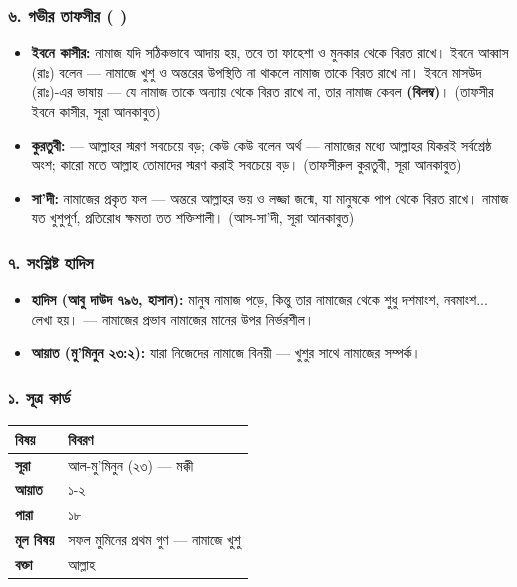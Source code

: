 \subsubsection*{৬. গভীর তাফসীর ( )}

\begin{itemize}
\item \textbf{ইবনে কাসীর:} নামাজ যদি সঠিকভাবে আদায় হয়, তবে তা ফাহেশা ও মুনকার থেকে বিরত রাখে। ইবনে আব্বাস (রাঃ) বলেন — নামাজে খুশু ও অন্তরের উপস্থিতি না থাকলে নামাজ তাকে বিরত রাখে না। ইবনে মাসউদ (রাঃ)-এর ভাষায় — যে নামাজ তাকে অন্যায় থেকে বিরত রাখে না, তার নামাজ কেবল \textbf{ (বিলম্ব)}। (তাফসীর ইবনে কাসীর, সূরা আনকাবুত)
\item \textbf{কুরতুবী:}    — আল্লাহর স্মরণ সবচেয়ে বড়; কেউ কেউ বলেন অর্থ — নামাজের মধ্যে আল্লাহর যিকরই সর্বশ্রেষ্ঠ অংশ; কারো মতে আল্লাহ তোমাদের স্মরণ করাই সবচেয়ে বড়। (তাফসীরুল কুরতুবী, সূরা আনকাবুত)
\item \textbf{সা'দী:} নামাজের প্রকৃত ফল — অন্তরে আল্লাহর ভয় ও লজ্জা জন্মে, যা মানুষকে পাপ থেকে বিরত রাখে। নামাজ যত খুশুপূর্ণ, প্রতিরোধ ক্ষমতা তত শক্তিশালী। (আস-সা'দী, সূরা আনকাবুত)
\end{itemize}
\subsubsection*{৭. সংশ্লিষ্ট হাদিস}

\begin{itemize}
\item \textbf{হাদিস (আবু দাউদ ৭৯৬, হাসান):} মানুষ নামাজ পড়ে, কিন্তু তার নামাজের থেকে শুধু দশমাংশ, নবমাংশ... লেখা হয়। — নামাজের প্রভাব নামাজের মানের উপর নির্ভরশীল।
\item \textbf{আয়াত (মু'মিনুন ২৩:২):} যারা নিজেদের নামাজে বিনয়ী — খুশুর সাথে নামাজের সম্পর্ক।
\end{itemize}
\subsubsection*{১. সূত্র কার্ড}

\begin{table}[h]\centering\small
\begin{tabular}{ll}
বিষয় & বিবরণ \\
\hline
\textbf{সূরা} & আল-মু'মিনুন (২৩) — মক্কী \\
\textbf{আয়াত} & ১-২ \\
\textbf{পারা} & ১৮ \\
\textbf{মূল বিষয়} & সফল মুমিনের প্রথম গুণ — নামাজে খুশু \\
\textbf{বক্তা} & আল্লাহ \\
\hline
\end{tabular}
\end{table}

